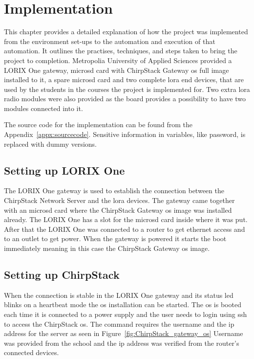 
\chapter{Implementation} \label{ch:impl}
This chapter provides a detailed explanation of how the project was implemented from the environment set-ups to the automation and execution of that automation.
It outlines the practises, techniques, and steps taken to bring the project to completion.
Metropolia University of Applied Sciences provided a LORIX One gateway, micro\gls{sd} card with ChirpStack Gateway \gls{os} full image installed to it, a spare micro\gls{sd} card and two complete \gls{lora} end devices, that are used by the students in the courses the project is implemented for. Two extra \gls{lora} radio modules were also provided as the board provides a possibility to have two modules connected into it.

The source code for the implementation can be found from the Appendix~\ref{appx:sourcecode}.
Sensitive information in variables, like password, is replaced with dummy versions.

\section{Setting up LORIX One}
The LORIX One gateway is used to establish the connection between the ChirpStack Network Server and the \gls{lora} devices.
The gateway came together with an micro\gls{sd} card where the ChirpStack Gateway \gls{os} image was installed already.
The LORIX One has a slot for the micro\gls{sd} card inside where it was put.
After that the LORIX One was connected to a router to get ethernet access and to an outlet to get power.
When the gateway is powered it starts the boot immediately meaning in this case the ChirpStack Gateway \gls{os} image.

\clearpage

\section{Setting up ChirpStack}
When the connection is stable in the LORIX One gateway and its status led blinks on a heartbeat mode the \gls{os} installation can be started.
The \gls{os} is booted each time it is connected to a power supply and the user needs to login using \gls{ssh} to access the ChirpStack \gls{os}\cite{chirpstack:gettingStarted}.
The command requires the username and the \gls{ip} address for the server as seen in Figure~\ref{fig:ChirpStack_gateway_os}
Username was provided from the school and the \gls{ip} address was verified from the router's connected devices.

